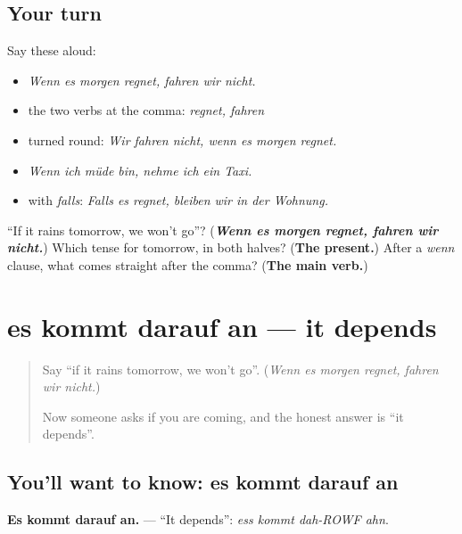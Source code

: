 \subsection*{Your turn}
Say these aloud:

\begin{itemize}
\raggedright
  \item \emph{Wenn es morgen regnet, fahren wir nicht.}
  \item the two verbs at the comma: \emph{regnet, fahren}
  \item turned round: \emph{Wir fahren nicht, wenn es morgen regnet.}
  \item \emph{Wenn ich müde bin, nehme ich ein Taxi.}
  \item with \emph{falls}: \emph{Falls es regnet, bleiben wir in der Wohnung.}
\end{itemize}

\begin{tcolorbox}[breakable,colback=teal!4,colframe=teal!35!black,title={Before you move on}]
\textquotedblleft{}If it rains tomorrow, we won't go\textquotedblright{}? (\emph{\textbf{Wenn es morgen regnet, fahren wir nicht.}}) Which tense for tomorrow, in both halves? (\textbf{The present.}) After a \emph{wenn} clause, what comes straight after the comma? (\textbf{The main verb.})
\end{tcolorbox}
\section[es kommt darauf an / das hängt davon ab]{es kommt darauf an — it depends}

\label{lesson:GE-C260-es-kommt-darauf-an}



\begin{quote}
Say \textquotedblleft{}if it rains tomorrow, we won't go\textquotedblright{}. (\emph{Wenn es morgen regnet, fahren wir nicht.})

Now someone asks if you are coming, and the honest answer is \textquotedblleft{}it depends\textquotedblright{}.
\end{quote}

\subsection*{You'll want to know: es kommt darauf an}
\textbf{Es kommt darauf an.} — \textquotedblleft{}It depends\textquotedblright{}: \emph{ess kommt dah-ROWF ahn}.

